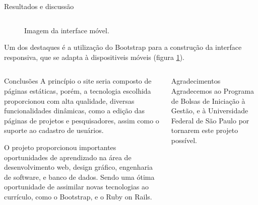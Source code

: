 \documentclass[final]{beamer} %
\begin{document}
\begin{frame}[t]
\begin{columns}[t]
\begin{column}{0.60\paperwidth}
\begin{block}{Resultados e discussão}
\begin{columns}[t,totalwidth=0.60\paperwidth]
\begin{column}{0.28\paperwidth}
\begin{itemize}
\begin{figure}[ht]
\begin{center}
							\caption{Imagem da interface móvel. \label{fig:mobile}}
						\end{center}
					\end{figure}
					Um dos destaques é a utilização do Bootstrap para a construção da interface responsiva, que se adapta à dispositiveis móveis (figura \ref{fig:mobile}).
					
				\end{itemize}
			\end{column}
		\end{columns}
	\end{block}
		\begin{columns}[t,totalwidth=0.60\paperwidth]
			\begin{column}{0.38\paperwidth}
				\begin{block}{Conclusões}
					A princípio o site seria composto de páginas estáticas, porém, a tecnologia escolhida proporcionou com alta qualidade, diversas funcionalidades dinâmicas, como a edição das páginas de projetos e pesquisadores, assim como o suporte ao cadastro de usuários.
					
					O projeto proporcionou importantes oportunidades de aprendizado na área de desenvolvimento web, design gráfico, engenharia de software, e banco de dados. Sendo uma ótima oportunidade de assimilar novas tecnologias ao currículo, como o Bootstrap, e o Ruby on Rails.		
				\end{block}
			\end{column}
			\begin{column}{0.18\paperwidth}
				\newline
				\newline
				\begin{alertblock}{Agradecimentos}
					Agradecemos ao Programa de Bolsas de Iniciação à Gestão, e à Universidade Federal de São Paulo por tornarem este projeto possível.
				\end{alertblock}
			\end{column}
		\end{columns}

   \end{column}
 \end{columns}
\end{frame}
\end{document}
